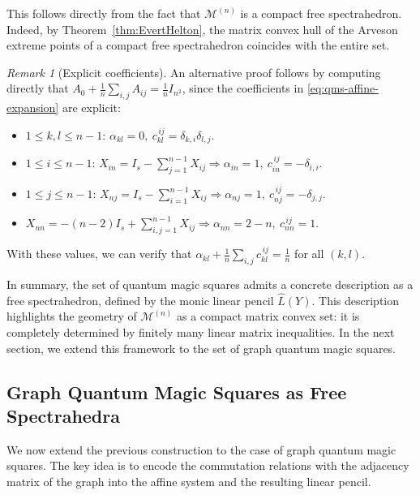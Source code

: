 \documentclass[11pt, a4paper]{article}
\theoremstyle{plain}
\theoremstyle{definition}
\theoremstyle{remark}
\newtheorem{remark}[theorem]{Remark}
\newcommand{\cM}{\mathcal{M}} \newcommand{\cN}{\mathcal{N}} \newcommand{\cO}{\mathcal{O}}
\begin{document}
This follows directly from the fact that \(\mathcal{M}^{(n)}\) is a compact free spectrahedron.
Indeed, by Theorem~\ref{thm:EvertHelton}, 
the matrix convex hull of the Arveson extreme points of a compact 
free spectrahedron coincides with the entire set.
\begin{remark}[Explicit coefficients]
An alternative proof follows by computing directly that \(A_0+\frac{1}{n}\sum_{i,j}A_{ij}=\tfrac{1}{n}I_{n^2}\), since the coefficients in \eqref{eq:qms-affine-expansion} are explicit:
\begin{itemize}
\item \(1\le k,l\le n-1\): \(\alpha_{kl}=0,\ c_{kl}^{\,ij}=\delta_{k,i}\delta_{l,j}\).
\item \(1\le i\le n-1\): \(X_{i n}=I_s-\sum_{j=1}^{n-1}X_{ij}\Rightarrow\alpha_{in}=1,\ c_{in}^{\,ij}=-\delta_{i,i}\).
\item \(1\le j\le n-1\): \(X_{n j}=I_s-\sum_{i=1}^{n-1}X_{ij}\Rightarrow\alpha_{nj}=1,\ c_{nj}^{\,ij}=-\delta_{j,j}\).
\item \(X_{nn}=-(n-2)I_s+\sum_{i,j=1}^{n-1}X_{ij}\Rightarrow\alpha_{nn}=2-n,\ c_{nn}^{\,ij}=1\).
\end{itemize}
With these values, we can verify that \(\alpha_{kl}+\frac{1}{n}\sum_{i,j}c_{kl}^{\,ij}=\frac{1}{n}\) for all \((k,l)\).
\end{remark}
\medskip
\noindent
In summary, the set of quantum magic squares admits a concrete description as a free spectrahedron, defined by the monic linear pencil \(\widehat L(Y)\). 
This description highlights the geometry of \(\cM^{(n)}\) as a compact matrix convex set: it is completely determined by finitely many linear matrix inequalities.
In the next section, we extend this framework to the set of graph quantum magic squares.
\subsection{Graph Quantum Magic Squares as Free Spectrahedra}\label{sec:GQMS_construction}

We now extend the previous construction to the case of graph quantum magic squares. 
The key idea is to encode the commutation relations with the adjacency matrix of the graph into the affine system and the resulting linear pencil.
\end{document}
